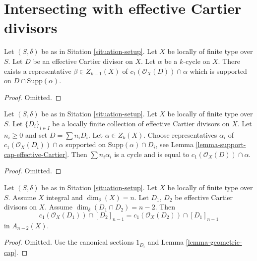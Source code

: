 \section{Intersecting with effective Cartier divisors}
\label{section-intersecting-effective-Cartier}

\begin{lemma}
\label{lemma-support-cap-effective-Cartier}
Let $(S, \delta)$ be as in Sitation \ref{situation-setup}.
Let $X$ be locally of finite type over $S$.
Let $D$ be an effective Cartier divisor on $X$.
Let $\alpha$ be a $k$-cycle on $X$.
There exists a representative $\beta \in Z_{k - 1}(X)$ of
$c_1(\mathcal{O}_X(D)) \cap \alpha$ which is
supported on $D \cap \text{Supp}(\alpha)$.
\end{lemma}

\begin{proof}
Omitted.
\end{proof}


\begin{lemma}
\label{lemma-improved-additivity}
Let $(S, \delta)$ be as in Sitation \ref{situation-setup}.
Let $X$ be locally of finite type over $S$.
Let $\{D_i\}_{i \in I}$ be a locally finite collection
of effective Cartier divisors on $X$. Let $n_i \geq 0$
and set $D = \sum n_i D_i$.
Let $\alpha \in Z_k(X)$. Choose representatives
$\alpha_i$ of $c_1(\mathcal{O}_X(D_i)) \cap \alpha$
supported on $\text{Supp}(\alpha) \cap D_i$, see
Lemma \ref{lemma-support-cap-effective-Cartier}.
Then $\sum n_i \alpha _i$ is a cycle and is equal
to $c_1(\mathcal{O}_X(D)) \cap \alpha$.
\end{lemma}

\begin{proof}
Omitted.
\end{proof}

\begin{lemma}
\label{lemma-commutativity-effective-Cartier-proper-intersection}
Let $(S, \delta)$ be as in Sitation \ref{situation-setup}.
Let $X$ be locally of finite type over $S$.
Assume $X$ integral and $\dim_\delta(X) = n$.
Let $D_1$, $D_2$ be effective Cartier divisors on $X$.
Assume $\dim_\delta(D_1 \cap D_2) = n - 2$. Then
$$
c_1(\mathcal{O}_X(D_1)) \cap [D_2]_{n - 1}
=
c_1(\mathcal{O}_X(D_2)) \cap [D_1]_{n - 1}
$$
in $A_{n - 2}(X)$.
\end{lemma}

\begin{proof}
Omitted. Use the canonical sections $1_{D_i}$ and
Lemma \ref{lemma-geometric-cap}.
\end{proof}


